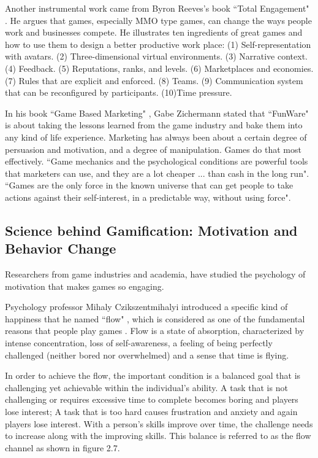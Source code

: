 Another instrumental work came from Byron Reeves's book ``Total Engagement" \cite {reeves2009total}.
He argues that games, especially MMO type games, can change the ways people work and businesses compete. He illustrates ten ingredients of great games and how to use them to design a better productive work place:
(1) Self-representation with avatars. (2) Three-dimensional virtual environments. (3) Narrative context. (4) Feedback. (5) Reputations, ranks, and levels. (6) Marketplaces and economies. (7) Rules that are explicit and enforced. (8) Teams. (9) Communication system that can be reconfigured by participants. (10)Time pressure.  

In his book ``Game Based Marketing" \cite {zichermann2010game}, Gabe Zichermann stated that ``FunWare" is about taking the lessons learned from the game industry and bake them into any kind of life experience. Marketing has always been about a certain degree of persuasion and motivation, and a degree of manipulation. Games do that most effectively. ``Game mechanics and the psychological conditions are powerful tools that marketers can use, and they are a lot cheaper ... than cash in the long run". ``Games are the only force in the known universe that can get people to take actions against their self-interest, in a predictable way, without using force". 

\subsection{Science behind Gamification: Motivation and Behavior Change}
Researchers from game industries and academia, have studied the psychology of motivation that makes games so engaging. 

Psychology professor Mihaly Czikszentmihalyi introduced a specific kind of happiness that he named ``flow" \cite{csikszentmihalyi1991flow}, which is considered as one of the fundamental reasons that people play games \cite{murphygames}. Flow is a state of absorption, characterized by intense concentration, loss of self-awareness, a feeling of being perfectly challenged (neither bored nor overwhelmed) and a sense that time is flying.

In order to achieve the flow, the important condition is a balanced goal that is challenging yet achievable within the individual's ability. A task that is not challenging or requires excessive time to complete becomes boring and players lose interest; A task that is too hard causes frustration and anxiety and again players lose interest. With a person's skills improve over time, the challenge needs to increase along with the improving skills. This balance is referred to as the flow channel as shown in figure 2.7.

